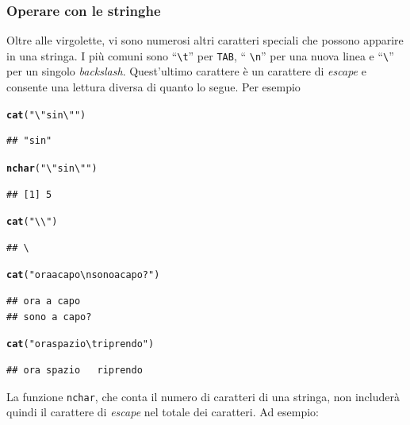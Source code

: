 \documentclass[onecolumn,12pt]{book}\usepackage[]{graphicx}\usepackage[]{color}
\makeatletter
\newcommand{\hlstr}[1]{\textcolor[rgb]{0.192,0.494,0.8}{#1}}%
\newcommand{\hlstd}[1]{\textcolor[rgb]{0.345,0.345,0.345}{#1}}%
\newcommand{\hlkwd}[1]{\textcolor[rgb]{0.737,0.353,0.396}{\textbf{#1}}}%
\newenvironment{kframe}{%
 \def\at@end@of@kframe{}%
 \ifinner\ifhmode%
  \def\at@end@of@kframe{\end{minipage}}%
  \begin{minipage}{\columnwidth}%
 \fi\fi%
 \def\FrameCommand##1{\hskip\@totalleftmargin \hskip-\fboxsep
 \colorbox{shadecolor}{##1}\hskip-\fboxsep
     \hskip-\linewidth \hskip-\@totalleftmargin \hskip\columnwidth}%
 \MakeFramed {\advance\hsize-\width
   \@totalleftmargin\z@ \linewidth\hsize
   \@setminipage}}%
 {\par\unskip\endMakeFramed%
 \at@end@of@kframe}
\newenvironment{knitrout}{}{} %
\makeatother
\begin{document}
\subsubsection{Operare con le stringhe}
Oltre alle virgolette, vi sono numerosi altri caratteri speciali che possono apparire in una stringa.
I pi\`u comuni sono ``\texttt{\textbackslash t}'' per \texttt{TAB}, `` \texttt{\textbackslash n}'' per una nuova linea e ``\texttt{\textbackslash }'' per un singolo {\it backslash}.
Quest'ultimo carattere \`e un carattere di \emph{escape} e consente una lettura diversa di quanto lo segue.  Per esempio
\begin{knitrout}
\color{fgcolor}\begin{kframe}
\begin{alltt}
\hlkwd{cat}\hlstd{(}\hlstr{"\textbackslash{}"sin\textbackslash{}""}\hlstd{)}
\end{alltt}
\begin{verbatim}
## "sin"
\end{verbatim}
\begin{alltt}
\hlkwd{nchar}\hlstd{(}\hlstr{"\textbackslash{}"sin\textbackslash{}""}\hlstd{)}
\end{alltt}
\begin{verbatim}
## [1] 5
\end{verbatim}
\begin{alltt}
\hlkwd{cat}\hlstd{(}\hlstr{"\textbackslash{}\textbackslash{}"}\hlstd{)}
\end{alltt}
\begin{verbatim}
## \
\end{verbatim}
\begin{alltt}
\hlkwd{cat}\hlstd{(}\hlstr{"ora a capo\textbackslash{}nsono a capo?"}\hlstd{)}
\end{alltt}
\begin{verbatim}
## ora a capo
## sono a capo?
\end{verbatim}
\begin{alltt}
\hlkwd{cat}\hlstd{(}\hlstr{"ora spazio\textbackslash{}triprendo"}\hlstd{)}
\end{alltt}
\begin{verbatim}
## ora spazio	riprendo
\end{verbatim}
\end{kframe}
\end{knitrout}
La funzione \texttt{nchar},  che conta il numero di caratteri di una stringa, non includer\`a quindi il carattere di \emph{escape} nel totale dei caratteri. Ad esempio:
\end{document}
